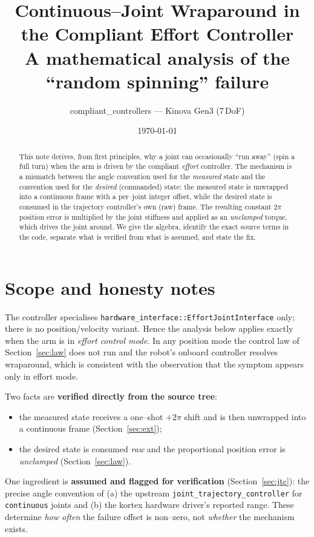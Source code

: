 \documentclass[11pt]{article}
\title{Continuous--Joint Wraparound in the Compliant Effort Controller\\
\large A mathematical analysis of the ``random spinning'' failure}
\author{compliant\_controllers --- Kinova Gen3 (7\,DoF)}
\date{\today}
\begin{document}
\maketitle

\begin{abstract}
This note derives, from first principles, why a joint can occasionally
``run away'' (spin a full turn) when the arm is driven by the compliant
\emph{effort} controller. The mechanism is a mismatch between the angle
convention used for the \emph{measured} state and the convention used for
the \emph{desired} (commanded) state: the measured state is unwrapped into
a continuous frame with a per--joint integer offset, while the desired
state is consumed in the trajectory controller's own (raw) frame. The
resulting constant $2\pi$ position error is multiplied by the joint
stiffness and applied as an \emph{unclamped} torque, which drives the
joint around. We give the algebra, identify the exact source terms in the
code, separate what is verified from what is assumed, and state the fix.
\end{abstract}

\tableofcontents

\section{Scope and honesty notes}

The controller specialises \texttt{hardware\_interface::EffortJointInterface}
only; there is no position/velocity variant. Hence the analysis below applies
exactly when the arm is in \emph{effort control mode}. In any position mode the
control law of Section~\ref{sec:law} does not run and the robot's onboard
controller resolves wraparound, which is consistent with the observation that
the symptom appears only in effort mode.

Two facts are \textbf{verified directly from the source tree}:
\begin{itemize}
  \item the measured state receives a one--shot $+2\pi$ shift and is then
        unwrapped into a continuous frame (Section~\ref{sec:ext});
  \item the desired state is consumed \emph{raw} and the proportional
        position error is \emph{unclamped} (Section~\ref{sec:law}).
\end{itemize}

One ingredient is \textbf{assumed and flagged for verification}
(Section~\ref{sec:jtc}): the precise angle convention of (a) the upstream
\texttt{joint\_trajectory\_controller} for \texttt{continuous} joints and
(b) the kortex hardware driver's reported range. These determine
\emph{how often} the failure offset is non--zero, not \emph{whether} the
mechanism exists.
\end{document}

